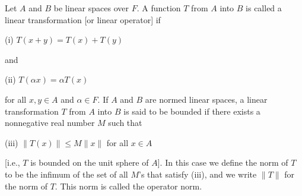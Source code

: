 Let $A$ and $B$ be linear spaces over $F$. A function $T$ from $A$ into $B$ is called a linear transformation [or linear operator] if

(i) $T(x + y) = T(x) + T(y)$

and

(ii) $T(\alpha x) = \alpha T(x)$

for all $x, y \in A$ and $\alpha \in F$. If $A$ and $B$ are normed linear spaces, a linear transformation $T$ from $A$ into $B$ is said to be bounded if there exists a nonnegative real number $M$ such that

(iii) $\| T(x) \| \leq M \| x \|$ for all $x \in A$

[i.e., $T$ is bounded on the unit sphere of $A$]. In this case we define the norm of $T$ to be the infimum of the set of all $M$'s that satisfy (iii), and we write $\| T \|$ for the norm of $T$. This norm is called the operator norm.